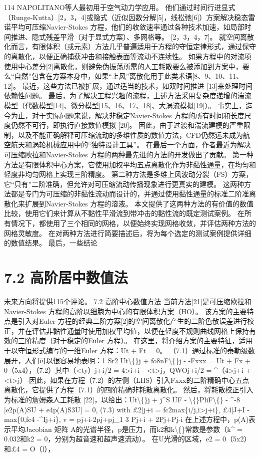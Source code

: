 \documentclass[UTF8,11pt,a4paper,openany,fontset=fandol]{ctexbook}
\begin{document}
114 NAPOLITANO等人最初用于空气动力学应用。 他们通过时间行进显式（Runge-Kutta）[2，3，4]或隐式（近似因数分解[5]，线松弛[6]）方案解决稳态雷诺平均可压缩Navier-Stokes 方程，他们的收敛速率通过各种技术加速，如局部时间推进、隐式残差平滑（对于显式方案）、多网格等。 [2，3，4，7]。 就空间离散化而言，有限体积（或元素）方法几乎普遍适用于方程的守恒定律形式，通过保守的离散化，以便正确捕获冲击和接触表面等流动不连续性。 如果方程中的对流项使用中心差分[2]离散化，则避免伪振荡所需的人工耗散要么被添加到方案中，要么“自然”包含在方案本身中，如果“上风”离散化用于此类术语[8、9、10、11、12]。 最近，这些方法已被扩展，通过适当的技术，如双时间推进 [13]来处理时间依赖性问题。 最后，为了解决工程兴趣的流程，上述方法采用复杂度递增的湍流模型（代数模型[14]、微分模型[15、16、17、18]、大涡流模拟[19]）。 事实上，迄今为止，对于实际问题来说，解决非稳定Navier-Stokes 方程的所有时间和长度尺度仍然不可行，即执行直接数值模拟 [20]。 因此，由于过渡和湍流建模的严重限制，以及不能正确解释可压缩流动的多维性质的数值方法，CFD仍然远未成为航空航天和涡轮机械应用中的“独特设计工具”。 在最后一个方面，作者最近为解决可压缩欧拉和Navier-Stokes 方程的两种最先进的方法的开发做出了贡献。 第一种方法是有限体积中心方案，它使用加权平均五点离散化作为非黏性通量，在均匀和轻度非均匀网格上实现三阶精度。 第二种方法是多维上风波动分裂（FS）方案，它“只有”二阶准确，但允许对可压缩流动传播现象进行更真实的建模。 这两种方法都是专门为可压缩的非黏性流动而设计的，并通过使用黏性通量的标准二阶准离散化来扩展到Navier-Stokes 方程的溶液。 本文提供了这两种方法的有价值的数值比较，使用它们来计算从不黏性平滑流到带冲击的黏性流的既定测试案例。 在所有情况下，都使用了三个相同的网格，以便始终实现网格收敛，并评估两种方法的网格灵敏度。 在对两种方法进行简要描述后，将为每个选定的测试案例提供详细的数值结果。 最后，一些结论

\section{7.2 高阶居中数值法}
未来方向将提供115个评论。 7.2 高阶中心数值方法 当前方法[21]是可压缩欧拉和Navier-Stokes 方程的高阶以细胞为中心的有限体积方案（HO）。 该方案的主要特点是引入对Euler 方程的经典二阶方案[2]的空间离散化产生的二阶色散误差进行校正，并在评估非黏性通量时使用加权平均值，以便在轻度不规则曲线网格上保持有效的三阶精度（对于稳定的Euler 方程）。 在这里，将介绍方案的主要特征，适用于以守恒形式编写的一维Euler 方程：Ut + Ft = 0。 （7.1）通过标准的泰勒级数展开，人们可以很容易地表明：1 Sr2 Ut\textbackslash\{\}j + fo8nF\textbackslash\{\}j - -Fxxx = Ut + Fx + 0（5x4），（7.2）其中（<ty）j+i/2 = 4>i+i - <t>j，QWOj+i/2 = \textasciicircum{}（4>j+i + <t>j）-因此，如果在方程（7.2）的左侧（LHS）引入Fxxx的二阶精确中心五点离散化，它提供了方程（7.1）的四阶精确非耗散离散化。 然后，将耗散校正引入为标准的詹姆森人工耗散 [22]，以给出：Ut\textbackslash\{\}j + j\textasciicircum{}S UF - \textbackslash\{\}PliF\textbackslash\{\} - \textasciicircum{}-8 [e2p(A)SU + e4p(A)S3U] = 0, (7.3) with £2|j+i = fc2max\{i/j,i>j+i\}, £4|J+I - max\{0,fc4 -\textasciicircum{}Ij+i\}, v = pj+i-2pj+pj\_1 3 Pj+i + 2Pj+Pj-i 在上述方程中，p(A)表示平均Jacobian 矩阵 A的光谱半径，p是压力，而k2和k\textbackslash\{\}常数是参数（k\textasciicircum{} = 0.032和k2 = 0，分别为超音速和超声速流动）。 在U光滑的区域，e2 = 0（5x2）和£4 = O（l），
\end{document}

